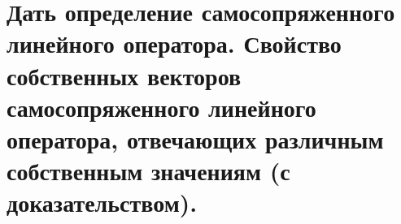 \section{
    Дать определение самосопряженного линейного  оператора. Свойство собственных векторов самосопряженного линейного оператора, отвечающих различным собственным значениям (с доказательством).
}


